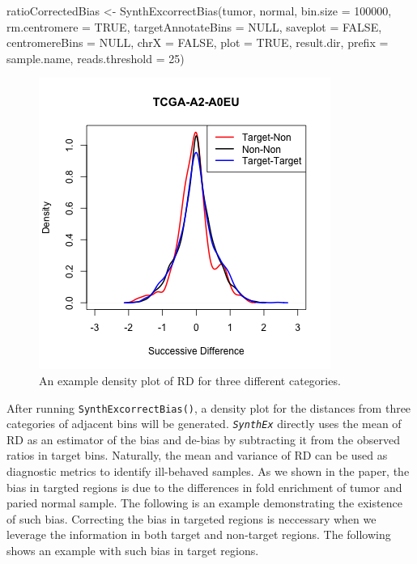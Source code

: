 \documentclass{article}
\newcommand{\pkg}[1]{\texttt{\textsl{#1}}}
\newcommand{\code}[1]{\texttt{#1}}
\begin{document}
\begin{Schunk}
\begin{Sinput}
 ratioCorrectedBias <- SynthExcorrectBias(tumor, normal,
                bin.size = 100000, rm.centromere = TRUE,
                targetAnnotateBins = NULL, saveplot = FALSE,
                centromereBins = NULL, chrX = FALSE,
                plot = TRUE, result.dir,
                prefix = sample.name, reads.threshold = 25)
\end{Sinput}
\end{Schunk}

\begin{figure}
\begin{center}
\includegraphics[width=.5\textwidth]{figure/fig1-1}
\end{center}
\caption{An example density plot of RD for three different categories.}
\label{fig:1}
\end{figure}

After running \code{SynthExcorrectBias()}, a density plot for the distances from three categories of adjacent bins will be generated. \pkg{SynthEx} directly uses the mean of RD as an estimator of the bias and de-bias by subtracting it from the observed ratios in target bins. Naturally, the mean and variance of RD can be used as diagnostic metrics to identify ill-behaved samples. As we shown in the paper, the bias in targted regions is due to the differences in fold enrichment of tumor and paried normal sample. The following is an example demonstrating the existence of such bias. Correcting the bias in targeted regions is neccessary when we leverage the information in both target and non-target regions. The following shows an example with such bias in target regions.

\begin{Schunk}
\end{Schunk}
\end{document}
